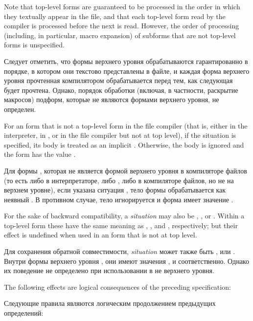 \begin{newer}
\begin{defspec}
  Note that top-level forms are guaranteed to be processed in the order
  in which they textually appear in the file, and that each top-level
  form read by the compiler is processed before the next is read.
  However, the order of processing (including, in particular, macro
  expansion) of subforms that are not top-level forms is unspecified.

  Следует отметить, что формы верхнего уровня обрабатываются гарантированно в
  порядке, в котором они текстово представлены в файле, и каждая форма верхнего
  уровня прочтенная компилятором обрабатывается перед тем, как следующая будет
  прочтена.
  Однако, порядок обработки (включая, в частности, раскрытие макросов) подформ,
  которые не являются формами верхнего уровня, не определен.

  For an  form that is not a top-level form in the file compiler
  (that is, either in the interpreter, in , or in the file
  compiler but not at top level), if the  situation is specified,
  its body is treated as an implicit .  Otherwise, the body
  is ignored and the  form has the value .

  Для формы , которая не является формой верхнего уровня в
  компиляторе файлов (то есть либо в интерпретаторе, либо , либо в
  компиляторе файлов, но не на верхнем уровне), если указана ситуация
  , тело формы обрабатывается как неявный . В противном
  случае, тело игнорируется и форма  имеет значение .

  For the sake of backward compatibility,
  a \textit{situation} may also be , , or .
  Within a top-level  form
  these have the same meaning as , ,
  and , respectively; but their effect is undefined when used
  in an  form that is not at top level.

  Для сохранения обратной совместимости, \textit{situation} может также быть
  ,  или .
  Внутри формы верхнего уровня , они имеют значения
  ,  и  соответственно.
  Однако их поведение не определено при использовании в  не
  верхнего уровня.

  The following effects are logical consequences of the preceding specification:

  Следующие правила являются логическим продолжением предыдущих определений:


\end{defspec}
\end{newer}
